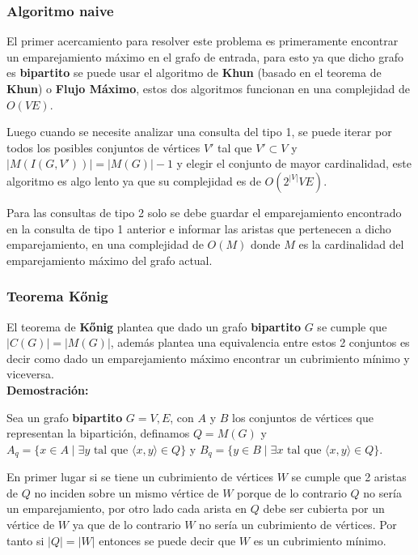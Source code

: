 \documentclass{article}
\begin{document}
\subsubsection{Algoritmo naive}

El primer acercamiento para resolver este problema es primeramente encontrar un emparejamiento máximo en el grafo de entrada,
para esto ya que dicho grafo es \textbf{bipartito} se puede usar el algoritmo de \textbf{Khun} (basado en el teorema de \textbf{Khun})
o \textbf{Flujo Máximo}, estos dos algoritmos funcionan en una complejidad de $O(V E)$.

Luego cuando se necesite analizar una consulta del tipo 1, se puede iterar por todos los posibles conjuntos de vértices $V'$ tal que
$V' \subset V$ y $|M(I(G,V'))|=|M(G)|-1$ y elegir el conjunto de mayor cardinalidad, este algoritmo es algo lento ya que su complejidad es de $O(2^{|V|}V E)$.

Para las consultas de tipo 2 solo se debe guardar el emparejamiento encontrado en la consulta de tipo 1 anterior e informar
las aristas que pertenecen a dicho emparejamiento, en una complejidad de $O(M)$ donde $M$ es la cardinalidad del emparejamiento máximo del grafo actual.

\subsubsection{Teorema Kőnig}

El teorema de \textbf{Kőnig} plantea que dado un grafo \textbf{bipartito} $G$ se cumple que $|C(G)|=|M(G)|$, además plantea una equivalencia
entre estos 2 conjuntos es decir como dado un emparejamiento máximo encontrar un cubrimiento mínimo y viceversa.\\

\textbf{Demostración:}

Sea un grafo \textbf{bipartito} $G=V,E$, con $A$ y $B$ los conjuntos de vértices que representan la bipartición, definamos $Q = M(G)$ y
$A_q = \{ x \in A \mid \exists y \text{ tal que } \langle x, y \rangle \in Q \}$
y $B_q = \{ y \in B \mid \exists x \text{ tal que } \langle x, y \rangle \in Q \}$.

En primer lugar si se tiene un cubrimiento de vértices $W$ se cumple que 2 aristas de $Q$ no inciden
sobre un mismo vértice de $W$ porque de lo contrario $Q$ no sería un emparejamiento, por otro lado cada arista en $Q$ debe ser
cubierta por un vértice de $W$ ya que de lo contrario $W$ no sería un cubrimiento de vértices. Por tanto si $|Q|=|W|$ entonces se puede
decir que $W$ es un cubrimiento mínimo.
\end{document}
